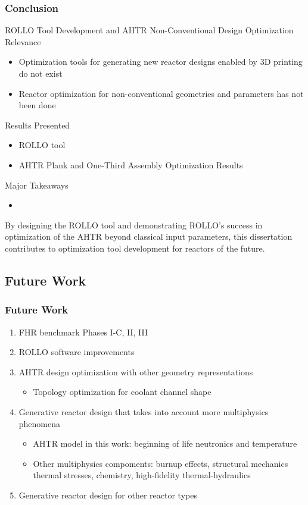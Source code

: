\begin{frame}
    \frametitle{Conclusion}
    \begin{block}{ROLLO Tool Development and AHTR Non-Conventional Design Optimization}
        Relevance
        \begin{itemize}
            \item Optimization tools for generating new reactor designs enabled by
            3D printing do not exist
            \item Reactor optimization for non-conventional geometries and parameters 
            has not been done 
        \end{itemize}
        Results Presented
        \begin{itemize}
            \item \acrfull{ROLLO} tool 
            \item AHTR Plank and One-Third Assembly Optimization Results 
        \end{itemize}
        Major Takeaways 
        \begin{itemize}
            \item 
        \end{itemize}
    \end{block}

    By designing the \gls{ROLLO} tool and demonstrating \gls{ROLLO}'s success in 
    optimization of the \gls{AHTR} beyond classical input parameters, this dissertation 
    contributes to optimization tool development for reactors of the future. 
\end{frame}

\subsection{Future Work}
\begin{frame}
    \frametitle{Future Work}
    \begin{enumerate}
        \item FHR benchmark Phases I-C, II, III
        \item ROLLO software improvements 
        \item AHTR design optimization with other geometry representations 
            \begin{itemize}
                \item Topology optimization for coolant channel shape 
            \end{itemize}
        \item Generative reactor design that takes into account more multiphysics phenomena 
            \begin{itemize}
                \item AHTR model in this work: beginning of life neutronics and temperature 
                \item Other multiphysics compoments: burnup effects, structural mechanics 
                thermal stresses, chemistry, high-fidelity thermal-hydraulics 
            \end{itemize}
        \item Generative reactor design for other reactor types
    \end{enumerate}
\end{frame}